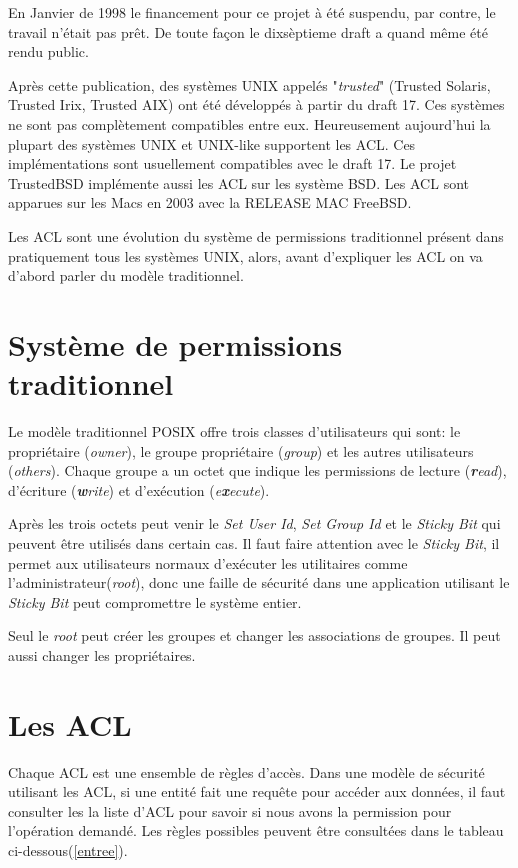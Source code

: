 \documentclass{article}
\begin{document}
En Janvier de 1998\cite{aclsuse} le financement pour ce projet à été suspendu, par contre, le travail n'était pas prêt. De toute façon le dixsèptieme draft a quand même été rendu public\cite{posix17}.
 
Après cette publication, des systèmes UNIX appelés "\emph{trusted}" (Trusted Solaris, Trusted Irix, Trusted AIX) ont été développés à partir du draft 17. Ces systèmes ne sont pas complètement compatibles entre eux. Heureusement aujourd'hui la plupart des systèmes UNIX et UNIX-like supportent les ACL. Ces implémentations sont usuellement compatibles avec le draft 17. Le projet TrustedBSD implémente aussi les ACL sur les système BSD. Les ACL sont apparues sur les Macs en 2003 avec la RELEASE MAC FreeBSD.
 
Les ACL sont une évolution du système de permissions traditionnel présent dans pratiquement tous les systèmes UNIX, alors, avant d'expliquer les ACL on va d'abord parler du modèle traditionnel.

\section{Système de permissions traditionnel}
 
Le modèle traditionnel POSIX offre trois classes d'utilisateurs qui sont: le propriétaire (\emph{owner}), le groupe propriétaire (\emph{group}) et les autres utilisateurs (\emph{others}). Chaque groupe a un octet que indique les permissions de lecture (\emph{\textbf{r}ead}), d'écriture (\emph{\textbf{w}rite}) et d'exécution (\emph{e\textbf{x}ecute}).
 
Après les trois octets peut venir le \emph{Set User Id}, \emph{Set Group Id} et le \emph{Sticky Bit} qui peuvent être utilisés dans certain cas. Il faut faire attention avec le \emph{Sticky Bit}, il permet aux utilisateurs normaux d'exécuter les utilitaires comme l'administrateur(\emph{root}), donc une faille de sécurité dans une application utilisant le \emph{Sticky Bit} peut compromettre le système entier.
 
Seul le \emph{root} peut créer les groupes et changer les associations de groupes. Il peut aussi changer les propriétaires.
 
\section{Les ACL}
 
Chaque ACL est une ensemble de règles d'accès. Dans une modèle de sécurité utilisant les ACL, si une entité fait une requête pour accéder aux données, il faut consulter les la liste d'ACL pour savoir si nous avons la permission pour l'opération demandé. Les règles possibles peuvent être consultées dans le tableau ci-dessous(\ref{entree}).
\end{document}
